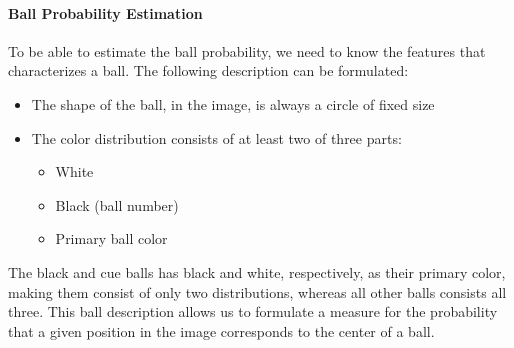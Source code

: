 \paragraph{Ball Probability Estimation}
To be able to estimate the ball probability, we need to know the features that characterizes a ball. The following description can be formulated:
\begin{itemize}
\item The shape of the ball, in the image, is always a circle of fixed size
\item The color distribution consists of at least two of three parts:
	\begin{itemize}
		\item White
		\item Black (ball number)
		\item Primary ball color
	\end{itemize}
\end{itemize}
The black and cue balls has black and white, respectively, as their primary color, making them consist of only two distributions, whereas all other balls consists all three. This ball description allows us to formulate a measure for the probability that a given position in the image corresponds to the center of a ball.

